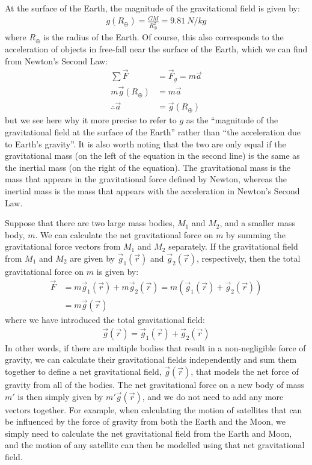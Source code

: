 At the surface of the Earth, the magnitude of the gravitational field is given by:
\begin{align*}
g(R_\oplus)=\frac{GM}{R_\oplus^2}=\SI{9.81}{N/kg}
\end{align*}
where $R_\oplus$ is the radius of the Earth. Of course, this also corresponds to the acceleration of objects in free-fall near the surface of the Earth, which we can find from Newton's Second Law:
\begin{align*}
\sum \vec F &= \vec F_g = m\vec a\\
m\vec g(R_\oplus)&= m\vec a\\
\therefore \vec a &= \vec g(R_\oplus)
\end{align*}
but we see here why it more precise to refer to $g$ as the ``magnitude of the gravitational field at the surface of the Earth'' rather than ``the acceleration due to Earth's gravity''. It is also worth noting that the two are only equal if the gravitational mass (on the left of the equation in the second line) is the same as the inertial mass (on the right of the equation). The gravitational mass is the mass that appears in the gravitational force defined by Newton, whereas the inertial mass is the mass that appears with the acceleration in Newton's Second Law.

Suppose that there are two large mass bodies, $M_1$ and $M_2$, and a smaller mass body, $m$. We can calculate the net gravitational force on $m$ by summing the gravitational force vectors from $M_1$ and $M_2$ separately. If the gravitational field from $M_1$ and $M_2$ are given by $\vec g_1(\vec r)$ and $\vec g_2(\vec r)$, respectively, then the total gravitational force on $m$ is given by:
\begin{align*}
\vec F &= m\vec g_1(\vec r) + m\vec g_2(\vec r)=m(\vec g_1(\vec r)+\vec g_2(\vec r))\\
&=m \vec g(\vec r)
\end{align*}
where we have introduced the total gravitational field:
\begin{align*}
\vec g(\vec r) = \vec g_1(\vec r)+\vec g_2(\vec r)
\end{align*}
In other words, if there are multiple bodies that result in a non-negligible force of gravity, we can calculate their gravitational fields independently and sum them together to define a net gravitational field, $\vec g(\vec r)$, that models the net force of gravity from all of the bodies. The net gravitational force on a new body of mass $m'$ is then simply given by $m'\vec g(\vec r)$, and we do not need to add any more vectors together. For example, when calculating the motion of satellites that can be influenced by the force of gravity from both the Earth and the Moon, we simply need to calculate the net gravitational field from the Earth and Moon, and the motion of any satellite can then be modelled using that net gravitational field.

